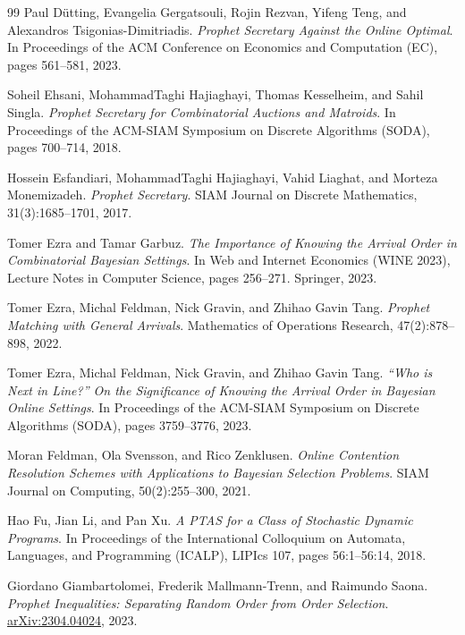 \documentclass[11pt]{article}
\theoremstyle{definition}
\theoremstyle{remark}
\begin{document}
\begin{thebibliography}{99}
Paul D\"utting, Evangelia Gergatsouli, Rojin Rezvan, Yifeng Teng, and Alexandros Tsigonias-Dimitriadis.
\emph{Prophet Secretary Against the Online Optimal}.
In Proceedings of the ACM Conference on Economics and Computation (EC), pages 561--581, 2023.

Soheil Ehsani, MohammadTaghi Hajiaghayi, Thomas Kesselheim, and Sahil Singla.
\emph{Prophet Secretary for Combinatorial Auctions and Matroids}.
In Proceedings of the ACM-SIAM Symposium on Discrete Algorithms (SODA), pages 700--714, 2018.

Hossein Esfandiari, MohammadTaghi Hajiaghayi, Vahid Liaghat, and Morteza Monemizadeh.
\emph{Prophet Secretary}.
SIAM Journal on Discrete Mathematics, 31(3):1685--1701, 2017.

Tomer Ezra and Tamar Garbuz.
\emph{The Importance of Knowing the Arrival Order in Combinatorial Bayesian Settings}.
In Web and Internet Economics (WINE 2023), Lecture Notes in Computer Science, pages 256--271. Springer, 2023.

Tomer Ezra, Michal Feldman, Nick Gravin, and Zhihao Gavin Tang.
\emph{Prophet Matching with General Arrivals}.
Mathematics of Operations Research, 47(2):878--898, 2022.

Tomer Ezra, Michal Feldman, Nick Gravin, and Zhihao Gavin Tang.
\emph{``Who is Next in Line?'' On the Significance of Knowing the Arrival Order in Bayesian Online Settings}.
In Proceedings of the ACM-SIAM Symposium on Discrete Algorithms (SODA), pages 3759--3776, 2023.

Moran Feldman, Ola Svensson, and Rico Zenklusen.
\emph{Online Contention Resolution Schemes with Applications to Bayesian Selection Problems}.
SIAM Journal on Computing, 50(2):255--300, 2021.

Hao Fu, Jian Li, and Pan Xu.
\emph{A PTAS for a Class of Stochastic Dynamic Programs}.
In Proceedings of the International Colloquium on Automata, Languages, and Programming (ICALP), LIPIcs 107, pages 56:1--56:14, 2018.

Giordano Giambartolomei, Frederik Mallmann-Trenn, and Raimundo Saona.
\emph{Prophet Inequalities: Separating Random Order from Order Selection}.
\href{https://arxiv.org/abs/2304.04024}{arXiv:2304.04024}, 2023.


\end{thebibliography}
\end{document}
